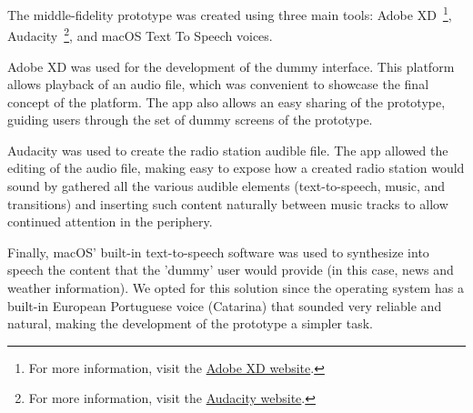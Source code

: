 {{The middle-fidelity prototype was created using three main tools: Adobe XD~\footnote{For more information, visit the \href{https://www.adobe.com/products/xd.html}{Adobe XD website}.}, Audacity~\footnote{For more information, visit the \href{https://www.audacityteam.org/}{Audacity website}.}, and macOS Text To Speech voices. 

Adobe XD was used for the development of the dummy interface. This platform allows playback of an audio file, which was convenient to showcase the final concept of the platform. The app also allows an easy sharing of the prototype, guiding users through the set of dummy screens of the prototype. 

Audacity was used to create the radio station audible file. The app allowed the editing of the audio file, making easy to expose how a created radio station would sound by gathered all the various audible elements (text-to-speech, music, and transitions) and inserting such content naturally between music tracks to allow continued attention in the periphery.

Finally, macOS' built-in text-to-speech software was used to synthesize into speech the content that the 'dummy' user would provide (in this case, news and weather information). We opted for this solution since the operating system has a built-in European Portuguese voice (Catarina) that sounded very reliable and natural, making the development of the prototype a simpler task.

}}
